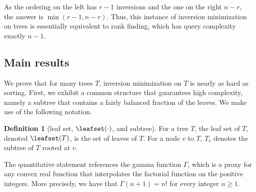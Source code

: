 \documentclass[11pt]{article}
\numberwithin{equation}{section}
\theoremstyle{definition}
\newtheorem{definition}[theorem]{Definition}
\theoremstyle{plain}
\begin{document}
As the ordering on the left has $r-1$ inversions and the one on the right $n-r$, the answer is $\min(r-1,n-r)$. Thus, this instance of inversion minimization on trees is essentially equivalent to rank finding, which has query complexity exactly $n-1$.

\subsection{Main results} 
%
We prove that for many trees $T$, inversion minimization on $T$ is nearly as hard as sorting. First, we exhibit a common structure that guarantees high complexity, namely a subtree that contains a fairly balanced fraction of the leaves. We make use of the following notation.
\begin{definition}[leaf set, $\leafset(\cdot)$, and subtree]
For a tree $T$, the leaf set of $T$, denoted $\leafset(T)$, is the set of leaves of $T$. For a node $v$ to $T$, $T_v$ denotes the subtree of $T$ rooted at $v$.
\end{definition}
The quantitative statement references the gamma function $\Gamma$, which is a proxy for any convex real function that interpolates the factorial function on the positive integers.  More precisely, %
we have that $\Gamma(n+1) = n!$ for every integer $n \ge 1$.
%
\end{document}
